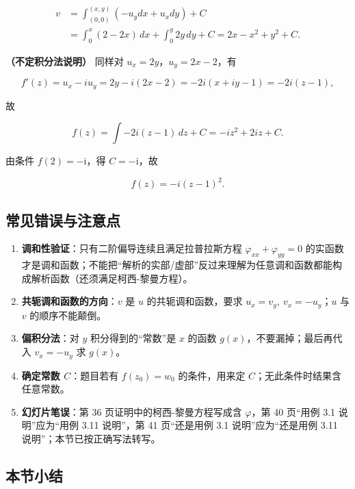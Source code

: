 \[
\begin{aligned}
v&=\int_{(0,0)}^{(x,y)}(-u_y dx+u_x dy)+C\\
&=\int_0^x(2-2x)\,dx+\int_0^y2y\,dy+C
=2x-x^2+y^2+C .
\end{aligned}
\]

\textbf{（不定积分法说明）} 同样对 \(u_x=2y\)，\(u_y=2x-2\)，有

\[
f'(z)=u_x-iu_y=2y-i(2x-2)=-2i(x+iy-1)=-2i(z-1),
\]

故

\[
f(z)=\int-2i(z-1)\,dz+C=-iz^2+2iz+C .
\]

由条件 \(f(2)=-\mathrm{i}\)，得 \(C=-\mathrm{i}\)，故

\[
f(z)=-i(z-1)^2 .
\]

\subsection{常见错误与注意点}\label{ux5e38ux89c1ux9519ux8befux4e0eux6ce8ux610fux70b9-10}

\begin{enumerate}
\def\labelenumi{\arabic{enumi}.}
\tightlist
\item
  \textbf{调和性验证}：只有二阶偏导连续且满足拉普拉斯方程
  \(\varphi_{xx}+\varphi_{yy}=0\)
  的实函数才是调和函数；不能把``解析的实部/虚部''反过来理解为任意调和函数都能构成解析函数（还须满足柯西-黎曼方程）。
\item
  \textbf{共轭调和函数的方向}：\(v\) 是 \(u\) 的共轭调和函数，要求
  \(u_x=v_y,\ v_x=-u_y\)；\(u\) 与 \(v\) 的顺序不能颠倒。
\item
  \textbf{偏积分法}：对 \(y\) 积分得到的``常数''是 \(x\) 的函数
  \(g(x)\)，不要漏掉；最后再代入 \(v_x=-u_y\) 求 \(g(x)\)。
\item
  \textbf{确定常数 \(C\)}：题目若有 \(f(z_0)=w_0\) 的条件，用来定
  \(C\)；无此条件时结果含任意常数。
\item
  \textbf{幻灯片笔误}：第 36 页证明中的柯西-黎曼方程写成含
  \(\varphi\)，第 40 页``用例 3.1 说明''应为``用例 3.11 说明''，第 41
  页``还是用例 3.1 说明''应为``还是用例 3.11
  说明''；本节已按正确写法转写。
\end{enumerate}

\subsection{本节小结}\label{ux672cux8282ux5c0fux7ed3-10}

